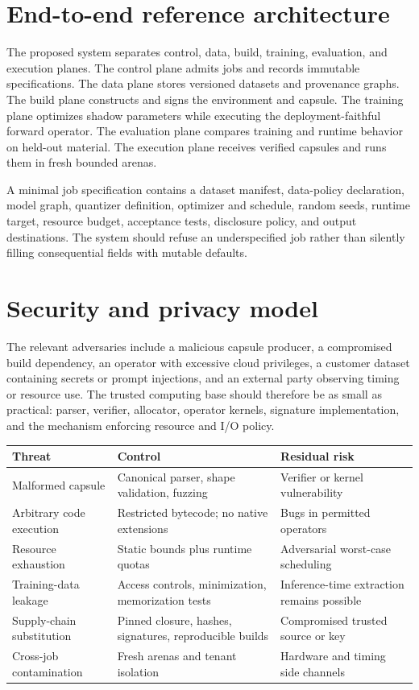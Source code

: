 \documentclass[11pt]{article}
\begin{document}
\section{End-to-end reference architecture}
The proposed system separates control, data, build, training, evaluation, and execution planes. The control plane admits jobs and records immutable specifications. The data plane stores versioned datasets and provenance graphs. The build plane constructs and signs the environment and capsule. The training plane optimizes shadow parameters while executing the deployment-faithful forward operator. The evaluation plane compares training and runtime behavior on held-out material. The execution plane receives verified capsules and runs them in fresh bounded arenas.

A minimal job specification contains a dataset manifest, data-policy declaration, model graph, quantizer definition, optimizer and schedule, random seeds, runtime target, resource budget, acceptance tests, disclosure policy, and output destinations. The system should refuse an underspecified job rather than silently filling consequential fields with mutable defaults.

\section{Security and privacy model}
The relevant adversaries include a malicious capsule producer, a compromised build dependency, an operator with excessive cloud privileges, a customer dataset containing secrets or prompt injections, and an external party observing timing or resource use. The trusted computing base should therefore be as small as practical: parser, verifier, allocator, operator kernels, signature implementation, and the mechanism enforcing resource and I/O policy.

\begin{longtable}{L{3cm}L{5cm}L{5.5cm}}
\toprule
\textbf{Threat} & \textbf{Control} & \textbf{Residual risk} \\
\midrule
\endhead
Malformed capsule & Canonical parser, shape validation, fuzzing & Verifier or kernel vulnerability \\
Arbitrary code execution & Restricted bytecode; no native extensions & Bugs in permitted operators \\
Resource exhaustion & Static bounds plus runtime quotas & Adversarial worst-case scheduling \\
Training-data leakage & Access controls, minimization, memorization tests & Inference-time extraction remains possible \\
Supply-chain substitution & Pinned closure, hashes, signatures, reproducible builds & Compromised trusted source or key \\
Cross-job contamination & Fresh arenas and tenant isolation & Hardware and timing side channels \\
\bottomrule
\end{longtable}
\end{document}
